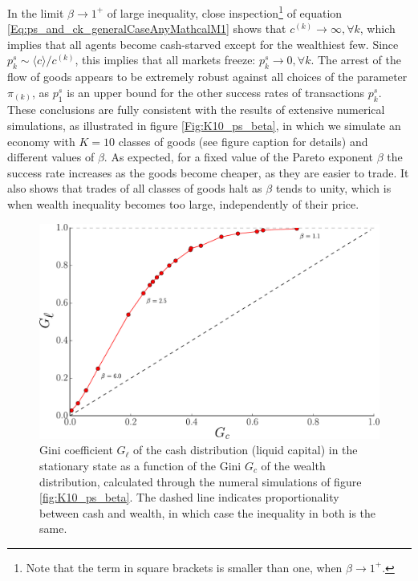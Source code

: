 In the limit  $\beta \to 1^+$ of large inequality, close inspection\footnote{Note that the term in square brackets is smaller than one, when $\beta \to 1^+$.} of equation \eqref{Eq:ps_and_ck_generalCaseAnyMathcalM1} shows that $ c^{(k)}  \to \infty, \forall k$, 
which implies that all agents become cash-starved except for the wealthiest few. Since $p^s_{k}\sim \langle c \rangle /c^{(k)}$, this implies that all markets freeze: $p^s_{k}\to 0 , \forall k$.  The arrest of the flow of goods appears to be  extremely robust against all choices of the parameter $\pi_{(k)}$, as $p^s_{1}$ is an upper bound for the other success rates of transactions $p^s_{k}$. These conclusions are fully consistent with the results of extensive numerical simulations, as illustrated in figure \ref{Fig:K10_ps_beta}, in which we simulate an economy with $K=10$ classes of goods (see figure caption for details) and different values of $\beta$. As expected, for a fixed value of the Pareto exponent $\beta$ the success rate increases as the goods become cheaper, as they are easier to trade.  It also shows that trades of all classes of goods halt as $\beta$ tends to unity, which is when wealth inequality becomes too large, independently of their price.

\begin{figure}%
\centering
\includegraphics[width=\textwidth]{figs_ineq/gini_intro.pdf}
\caption{Gini coefficient $G_\ell$ of the cash distribution (liquid capital) in the stationary state as a function of the Gini $G_c$ of the wealth distribution, calculated through the numeral simulations of figure \ref{fig:K10_ps_beta}. The dashed line indicates proportionality between cash and wealth, in which case the inequality in both is the same.}
\label{fig:gini}
\end{figure}

